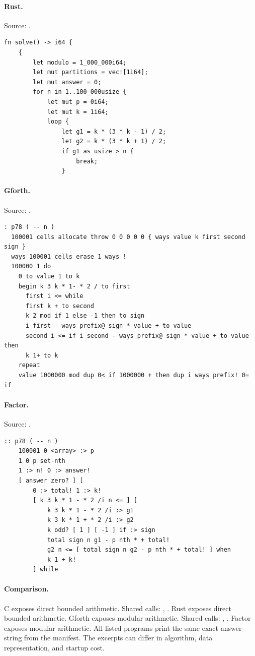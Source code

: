 \paragraph{Rust.} Source: .
\begin{lstlisting}
fn solve() -> i64 {
    {
        let modulo = 1_000_000i64;
        let mut partitions = vec![1i64];
        let mut answer = 0;
        for n in 1..100_000usize {
            let mut p = 0i64;
            let mut k = 1i64;
            loop {
                let g1 = k * (3 * k - 1) / 2;
                let g2 = k * (3 * k + 1) / 2;
                if g1 as usize > n {
                    break;
                }
\end{lstlisting}

\paragraph{Gforth.} Source: .
\begin{lstlisting}
: p78 ( -- n )
  100001 cells allocate throw 0 0 0 0 0 { ways value k first second sign }
  ways 100001 cells erase 1 ways !
  100000 1 do
    0 to value 1 to k
    begin k 3 k * 1- * 2 / to first
      first i <= while
      first k + to second
      k 2 mod if 1 else -1 then to sign
      i first - ways prefix@ sign * value + to value
      second i <= if i second - ways prefix@ sign * value + to value then
      k 1+ to k
    repeat
    value 1000000 mod dup 0< if 1000000 + then dup i ways prefix! 0= if
\end{lstlisting}

\paragraph{Factor.} Source: .
\begin{lstlisting}
:: p78 ( -- n )
    100001 0 <array> :> p
    1 0 p set-nth
    1 :> n! 0 :> answer!
    [ answer zero? ] [
        0 :> total! 1 :> k!
        [ k 3 k * 1 - * 2 /i n <= ] [
            k 3 k * 1 - * 2 /i :> g1
            k 3 k * 1 + * 2 /i :> g2
            k odd? [ 1 ] [ -1 ] if :> sign
            total sign n g1 - p nth * + total!
            g2 n <= [ total sign n g2 - p nth * + total! ] when
            k 1 + k!
        ] while
\end{lstlisting}

\paragraph{Comparison.}
C exposes direct bounded arithmetic. Shared calls: \texttt{}, \texttt{}. Rust exposes direct bounded arithmetic. Gforth exposes modular arithmetic. Shared calls: \texttt{}, \texttt{}. Factor exposes modular arithmetic.
All listed programs print the same exact answer string from the manifest. The excerpts can differ in algorithm, data representation, and startup cost.

